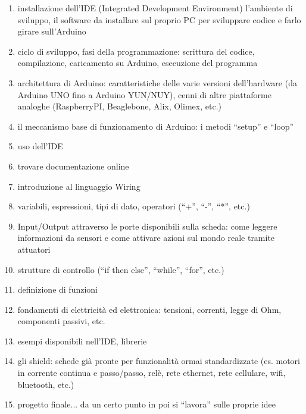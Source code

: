 \documentclass[a4paper,12pt]{article}
\begin{document}
\begin{enumerate}

\item installazione dell'IDE (Integrated Development Environment) l'ambiente 
di sviluppo, il software da installare sul proprio PC per sviluppare codice e 
farlo girare sull'Arduino

\item ciclo di sviluppo, fasi della programmazione: scrittura del codice, 
compilazione, caricamento su Arduino, esecuzione del programma

\item architettura di Arduino: caratteristiche delle varie versioni 
dell'hardware (da Arduino UNO fino a Arduino YUN/NUY), cenni di altre 
piattaforme analoghe (RaspberryPI, Beaglebone, Alix, Olimex, etc.)

\item il meccanismo base di funzionamento di Arduino: i metodi ``setup'' e 
``loop''

\item uso dell'IDE

\item trovare documentazione online

\item introduzione al linguaggio Wiring

\item variabili, espressioni, tipi di dato, operatori (``+'', ``-'', ``*'', 
etc.)

\item Input/Output attraverso le porte disponibili sulla scheda: come leggere 
informazioni da sensori e come attivare azioni sul mondo reale tramite attuatori

\item strutture di controllo (``if then else'', ``while'', ``for'', etc.)

\item definizione di funzioni

\item fondamenti di elettricità ed elettronica: tensioni, correnti, legge di 
Ohm, componenti passivi, etc.

\item esempi disponibili nell'IDE, librerie

\item gli shield: schede già pronte per funzionalità ormai standardizzate (es. 
motori in corrente continua e passo/passo, relè, rete ethernet, rete cellulare, 
wifi, bluetooth, etc.)

\item progetto finale... da un certo punto in poi si ``lavora'' sulle proprie 
idee


% 

\end{enumerate}
\end{document}
